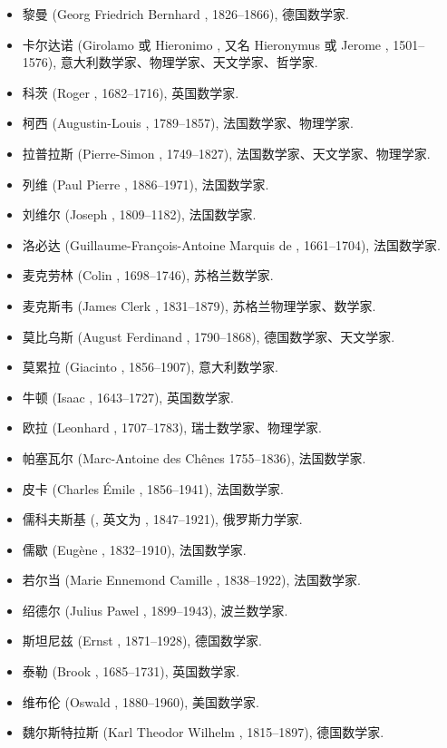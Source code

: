 \begin{itemize}
  \item 黎曼 (Georg Friedrich Bernhard , 1826--1866), 德国数学家.
  \item 卡尔达诺 (Girolamo 或 Hieronimo , 又名 Hieronymus  或 Jerome , 1501--1576), 意大利数学家、物理学家、天文学家、哲学家.
  \item 科茨 (Roger , 1682--1716), 英国数学家.
  \item 柯西 (Augustin-Louis , 1789--1857), 法国数学家、物理学家.
  \item 拉普拉斯 (Pierre-Simon , 1749--1827), 法国数学家、天文学家、物理学家.
  \item 列维 (Paul Pierre , 1886--1971), 法国数学家.
  \item 刘维尔 (Joseph , 1809--1182), 法国数学家.
  \item 洛必达 (Guillaume-François-Antoine Marquis de , 1661--1704), 法国数学家.
  \item 麦克劳林 (Colin , 1698--1746), 苏格兰数学家.
  \item 麦克斯韦 (James Clerk , 1831--1879), 苏格兰物理学家、数学家.
  \item 莫比乌斯 (August Ferdinand , 1790--1868), 德国数学家、天文学家.
  \item 莫累拉 (Giacinto , 1856--1907), 意大利数学家.
  \item 牛顿 (Isaac , 1643--1727), 英国数学家.
  \item 欧拉 (Leonhard , 1707--1783), 瑞士数学家、物理学家.
  \item 帕塞瓦尔 (Marc-Antoine  des Chênes 1755--1836), 法国数学家.
  \item 皮卡 (Charles Émile , 1856--1941), 法国数学家.
  \item 儒科夫斯基 (, 英文为 , 1847--1921), 俄罗斯力学家.
  \item 儒歇 (Eugène , 1832--1910), 法国数学家.
  \item 若尔当 (Marie Ennemond Camille , 1838--1922), 法国数学家.
  \item 绍德尔 (Julius Pawel , 1899--1943), 波兰数学家.
  \item 斯坦尼兹 (Ernst , 1871--1928), 德国数学家.
  \item 泰勒 (Brook , 1685--1731), 英国数学家.
  \item 维布伦 (Oswald , 1880--1960), 美国数学家.
  \item 魏尔斯特拉斯 (Karl Theodor Wilhelm , 1815--1897), 德国数学家.
\end{itemize}

